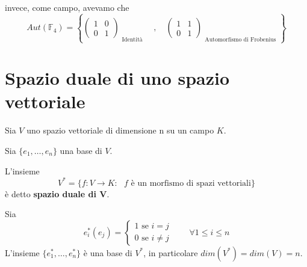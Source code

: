 \documentclass[../main.tex]{subfiles}
\begin{document}
\begin{example}
    invece, come campo, avevamo che
    \begin{equation*}
        Aut(\mathbb{F}_4) = \left\{
        \begin{pmatrix}
            1 & 0 \\
            0 & 1
        \end{pmatrix}_{\substack{\text{Identità}}}
        \quad,\quad
        \begin{pmatrix}
            1 & 1 \\
            0 & 1
        \end{pmatrix}_{\substack{\text{Automorfismo di Frobenius}}}
        \right\}
    \end{equation*}
\end{example}

\section{Spazio duale di uno spazio vettoriale}
\begin{definition}
    Sia $V$ uno spazio vettoriale di dimensione n su un campo $K$.

    Sia $\{e_1, \ldots, e_n\}$ una base di $V$.

    L'insieme
    \begin{equation*}
        V^* = \{f : V \rightarrow K : \text{ $f$ è un morfismo di spazi vettoriali} \}
    \end{equation*}
    è detto \textbf{spazio duale di V}.

    Sia
    \begin{equation*}
        e^*_i(e_j)= \begin{cases}
            1 \text{ se } i = j \\
            0 \text{ se } i \neq j
        \end{cases} \qquad \forall 1 \leq i \leq n
    \end{equation*}
    L'insieme $\{e^*_1, \ldots, e^*_n\}$ è una base di $V^*$, in particolare $dim(V^*) = dim(V) = n$.
\end{definition}
\end{document}
